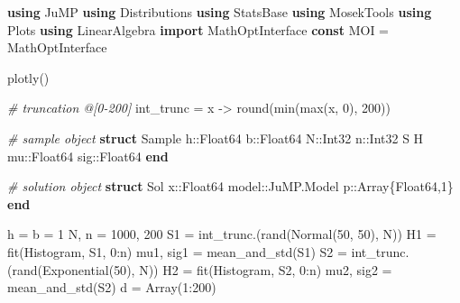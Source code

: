 \documentclass[
  10pt,
  a4paper,
,tablecaptionabove
]{scrartcl}
\newenvironment{Shaded}{}{}
\newcommand{\CommentTok}[1]{\textcolor[rgb]{0.38,0.63,0.69}{\textit{#1}}}
\newcommand{\DataTypeTok}[1]{\textcolor[rgb]{0.56,0.13,0.00}{#1}}
\newcommand{\FloatTok}[1]{\textcolor[rgb]{0.25,0.63,0.44}{#1}}
\newcommand{\KeywordTok}[1]{\textcolor[rgb]{0.00,0.44,0.13}{\textbf{#1}}}
\newcommand{\NormalTok}[1]{#1}
\newcommand{\OperatorTok}[1]{\textcolor[rgb]{0.40,0.40,0.40}{#1}}
\begin{document}
\begin{Shaded}
\begin{Highlighting}[]
\KeywordTok{using}\NormalTok{ JuMP}
\KeywordTok{using}\NormalTok{ Distributions}
\KeywordTok{using}\NormalTok{ StatsBase}
\KeywordTok{using}\NormalTok{ MosekTools}
\KeywordTok{using}\NormalTok{ Plots}
\KeywordTok{using}\NormalTok{ LinearAlgebra}
\KeywordTok{import}\NormalTok{ MathOptInterface}
\KeywordTok{const}\NormalTok{ MOI }\OperatorTok{=}\NormalTok{ MathOptInterface}

\NormalTok{plotly()}

\CommentTok{\# truncation @[0{-}200]}
\NormalTok{int\_trunc }\OperatorTok{=}\NormalTok{ x }\OperatorTok{{-}\textgreater{}}\NormalTok{ round(min(max(x}\OperatorTok{,} \FloatTok{0}\NormalTok{)}\OperatorTok{,} \FloatTok{200}\NormalTok{))}

\CommentTok{\# sample object}
\KeywordTok{struct}\NormalTok{ Sample}
\NormalTok{    h}\OperatorTok{::}\DataTypeTok{Float64}
\NormalTok{    b}\OperatorTok{::}\DataTypeTok{Float64}
\NormalTok{    N}\OperatorTok{::}\DataTypeTok{Int32}
\NormalTok{    n}\OperatorTok{::}\DataTypeTok{Int32}
\NormalTok{    S}
\NormalTok{    H}
\NormalTok{    mu}\OperatorTok{::}\DataTypeTok{Float64}
\NormalTok{    sig}\OperatorTok{::}\DataTypeTok{Float64}
\KeywordTok{end}

\CommentTok{\# solution object}
\KeywordTok{struct}\NormalTok{ Sol}
\NormalTok{    x}\OperatorTok{::}\DataTypeTok{Float64}
\NormalTok{    model}\OperatorTok{::}\NormalTok{JuMP.Model}
\NormalTok{    p}\OperatorTok{::}\DataTypeTok{Array}\NormalTok{\{}\DataTypeTok{Float64}\OperatorTok{,}\FloatTok{1}\NormalTok{\}}
\KeywordTok{end} 

\NormalTok{h }\OperatorTok{=}\NormalTok{ b }\OperatorTok{=} \FloatTok{1}
\NormalTok{N}\OperatorTok{,}\NormalTok{ n }\OperatorTok{=} \FloatTok{1000}\OperatorTok{,} \FloatTok{200}
\NormalTok{S1 }\OperatorTok{=}\NormalTok{ int\_trunc.(rand(Normal(}\FloatTok{50}\OperatorTok{,} \FloatTok{50}\NormalTok{)}\OperatorTok{,}\NormalTok{ N))}
\NormalTok{H1 }\OperatorTok{=}\NormalTok{ fit(Histogram}\OperatorTok{,}\NormalTok{ S1}\OperatorTok{,} \FloatTok{0}\OperatorTok{:}\NormalTok{n)}
\NormalTok{mu1}\OperatorTok{,}\NormalTok{ sig1 }\OperatorTok{=}\NormalTok{ mean\_and\_std(S1)}
\NormalTok{S2 }\OperatorTok{=}\NormalTok{ int\_trunc.(rand(Exponential(}\FloatTok{50}\NormalTok{)}\OperatorTok{,}\NormalTok{ N))}
\NormalTok{H2 }\OperatorTok{=}\NormalTok{ fit(Histogram}\OperatorTok{,}\NormalTok{ S2}\OperatorTok{,} \FloatTok{0}\OperatorTok{:}\NormalTok{n)}
\NormalTok{mu2}\OperatorTok{,}\NormalTok{ sig2 }\OperatorTok{=}\NormalTok{ mean\_and\_std(S2)}
\NormalTok{d }\OperatorTok{=} \DataTypeTok{Array}\NormalTok{(}\FloatTok{1}\OperatorTok{:}\FloatTok{200}\NormalTok{)}


\end{Highlighting}
\end{Shaded}
\end{document}
